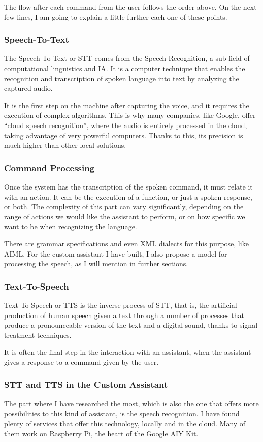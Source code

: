 The flow after each command from the user follows the order above. On the next few lines, I am going to explain a little further
each one of these points.

\subsubsection{Speech-To-Text}
The Speech-To-Text or STT comes from the Speech Recognition, a sub-field of computational linguistics and IA. It is a computer
technique that enables the recognition and transcription of spoken language into text by analyzing the captured audio.

It is the first step on the machine after capturing the voice, and it requires the execution of complex algorithms. This is why many
companies, like Google, offer “cloud speech recognition”, where the audio is entirely processed in the cloud, taking advantage of
very powerful computers. Thanks to this, its precision is much higher than other local solutions.

\subsubsection{Command Processing}
Once the system has the transcription of the spoken command, it must relate it with an action. It can be the execution of a function,
or just a spoken response, or both. The complexity of this part can vary significantly, depending on the range of actions we would
like the assistant to perform, or on how specific we want to be when recognizing the language.

There are grammar specifications and even XML dialects for this purpose, like AIML. For the custom assistant I have built, I also
propose a model for processing the speech, as I will mention in further sections.

\subsubsection{Text-To-Speech}
Text-To-Speech or TTS is the inverse process of STT, that is, the artificial production of human speech given a text through a
number of processes that produce a pronounceable version of the text and a digital sound, thanks to signal treatment techniques.

It is often the final step in the interaction with an assistant, when the assistant gives a response to a command given by the user.

\subsubsection{STT and TTS in the Custom Assistant}
The part where I have researched the most, which is also the one that offers more possibilities to this kind of assistant, is the
speech recognition. I have found plenty of services that offer this technology, locally and in the cloud. Many of them work on
Raspberry Pi, the heart of the Google AIY Kit.

